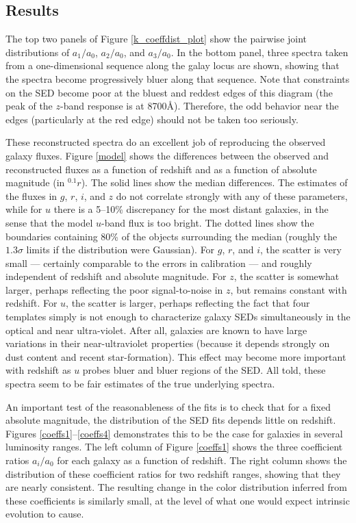 \documentclass[10pt,preprint]{aastex}
\newcommand{\band}[2]{\ensuremath{^{#1}{#2}}}
\begin{document}
\subsection{Results}

The top two panels of Figure \ref{k_coeffdist_plot} show the pairwise
joint distributions of $a_1/a_0$, $a_2/a_0$, and $a_3/a_0$. In the
bottom panel, three spectra taken from a one-dimensional sequence
along the galay locus are shown, showing that the spectra become
progressively bluer along that sequence. Note that constraints on the
SED become poor at the bluest and reddest edges of this diagram (the
peak of the $z$-band response is at 8700\AA). Therefore, the odd
behavior near the edges (particularly at the red edge) should not be
taken too seriously.

These reconstructed spectra do an excellent job of reproducing the
observed galaxy fluxes. Figure \ref{model} shows the differences
between the observed and reconstructed fluxes as a function of
redshift and as a function of absolute magnitude (in $\band{0.1}{r}$).
The solid lines show the median differences. The estimates of the
fluxes in $g$, $r$, $i$, and $z$ do not correlate strongly with any of
these parameters, while for $u$ there is a 5--10\% discrepancy for the
most distant galaxies, in the sense that the model $u$-band flux is
too bright. The dotted lines show the boundaries containing 80\% of
the objects surrounding the median (roughly the $1.3\sigma$ limits if
the distribution were Gaussian). For $g$, $r$, and $i$, the scatter is
very small --- certainly comparable to the errors in calibration ---
and roughly independent of redshift and absolute magnitude. For $z$,
the scatter is somewhat larger, perhaps reflecting the poor
signal-to-noise in $z$, but remains constant with redshift. For $u$,
the scatter is larger, perhaps reflecting the fact that four templates
simply is not enough to characterize galaxy SEDs simultaneously in the
optical and near ultra-violet. After all, galaxies are known to have
large variations in their near-ultraviolet properties (because it
depends strongly on dust content and recent star-formation). This
effect may become more important with redshift as $u$ probes bluer and
bluer regions of the SED. All told, these spectra seem to be fair
estimates of the true underlying spectra.

An important test of the reasonableness of the fits is to check that
for a fixed absolute magnitude, the distribution of the SED fits
depends little on redshift. Figures \ref{coeffs1}--\ref{coeffs4}
demonstrates this to be the case for galaxies in several luminosity
ranges. The left column of Figure \ref{coeffs1} shows the three
coefficient ratios $a_i/a_0$ for each galaxy as a function of
redshift. The right column shows the distribution of these coefficient
ratios for two redshift ranges, showing that they are nearly
consistent. The resulting change in the color distribution inferred
from these coefficients is similarly small, at the level of what one
would expect intrinsic evolution to cause.
\end{document}
